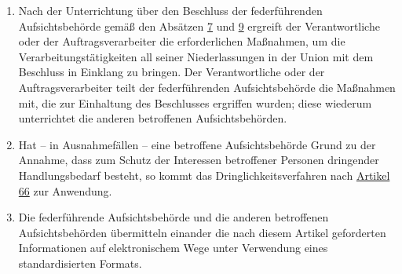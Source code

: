 \begin{enumerate}
  \item Nach der Unterrichtung über den Beschluss der federführenden Aufsichtsbehörde gemäß den Absätzen \hyperref
   [itm:60-7]{7} und \hyperref[itm:60-9]{9} ergreift der Verantwortliche oder der Auftragsverarbeiter die
   erforderlichen Maßnahmen, um die Verarbeitungstätigkeiten all seiner Niederlassungen in der Union mit dem Beschluss
   in Einklang zu bringen. Der Verantwortliche oder der Auftragsverarbeiter teilt der federführenden Aufsichtsbehörde
   die Maßnahmen mit, die zur Einhaltung des Beschlusses ergriffen wurden; diese wiederum unterrichtet die anderen
   betroffenen Aufsichtsbehörden.
  \label{itm:60-10}

  \item Hat -- in Ausnahmefällen -- eine betroffene Aufsichtsbehörde Grund zu der Annahme, dass zum Schutz der
   Interessen betroffener Personen dringender Handlungsbedarf besteht, so kommt das Dringlichkeitsverfahren nach
   \hyperref[ch:66]{Artikel 66} zur Anwendung.
  \label{itm:60-11}

  \item Die federführende Aufsichtsbehörde und die anderen betroffenen Aufsichtsbehörden übermitteln einander die nach
   diesem Artikel geforderten Informationen auf elektronischem Wege unter Verwendung eines standardisierten Formats.
  \label{itm:60-12}

\end{enumerate}



